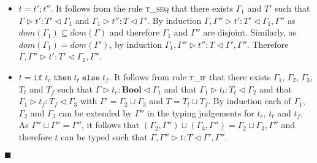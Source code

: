 \documentclass{article}
\newcommand{\tif}{\textsc{t\_if} }
\newcommand{\tseq}{\textsc{t\_seq} }
\newcommand{\typerule}[4]{#1 \triangleright #2 : #3 \triangleleft #4}
\newcommand{\boolt}{\mathbf{Bool}}
\newcommand{\ift}[3]{\mathtt{if} \; #1 \; \mathtt{then} \; #2 \; \mathtt{else} \; #3}
\newcommand{\qed}{$\blacksquare$}
\newenvironment{proof}{\vspace{1ex}\noindent{\bf Proof}\hspace{0.5em}}
  {\hfill\qed\vspace{1ex}}
\begin{document}
\begin{proof}
\begin{itemize}
\item $t = t' ; t''$. It follows from the rule \tseq that there exists
$\Gamma_1$ and $T'$ such that $\typerule{\Gamma}{t'}{T'}{\Gamma_1}$
and $\typerule{\Gamma_1}{t''}{T}{\Gamma'}$. By induction
$\typerule{\Gamma, \Gamma''}{t'}{T'}{\Gamma_1, \Gamma''}$
as $dom(\Gamma_1) \subseteq dom(\Gamma)$ and therefore
$\Gamma_1$ and $\Gamma''$ are disjoint.
Similarly, as $dom(\Gamma_1) = dom(\Gamma')$, by induction
$\typerule{\Gamma_1, \Gamma''}{t''}{T}{\Gamma', \Gamma''}$.
Therefore $\typerule{\Gamma, \Gamma''}{t'}{T'}{\Gamma_1, \Gamma''}$.

\item $t = \ift{t_c}{t_t}{t_f}$. It follows from rule \tif that there
exists $\Gamma_1$, $\Gamma_2$, $\Gamma_3$, $T_t$ and $T_f$ such that
$\typerule{\Gamma}{t_c}{\boolt}{\Gamma_1}$ and that
$\typerule{\Gamma_1}{t_t}{T_t}{\Gamma_2}$ and that
$\typerule{\Gamma_1}{t_f}{T_f}{\Gamma_3}$ with
$\Gamma' = \Gamma_2 \sqcup \Gamma_3$ and $T = T_t \sqcup T_f$.
By induction each of $\Gamma_1$, $\Gamma_2$ and $\Gamma_3$ can
be extended by $\Gamma''$ in the typing judgements for $t_c$,
$t_t$ and $t_f$. As $\Gamma'' \sqcup \Gamma'' = \Gamma''$, it
follows that $(\Gamma_2, \Gamma'') \sqcup (\Gamma_3, \Gamma'') = 
\Gamma_2 \sqcup \Gamma_3, \Gamma''$ and therefore $t$ can be
typed such that $\typerule{\Gamma, \Gamma''}{t}{T}{\Gamma', \Gamma''}$.

\end{itemize}

\end{proof}
\end{document}
